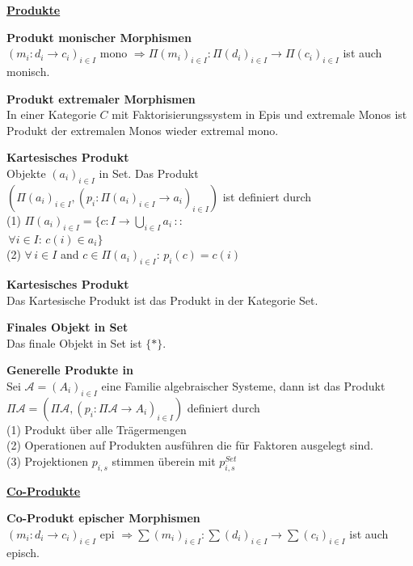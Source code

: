 \begin{multicols}{2}

\textbf{\underline{Produkte}} 

\textbf{ Produkt monischer Morphismen} \\
$(m_i: d_i \rightarrow c_i)_{i \in I}$ mono $\Rightarrow \Pi(m_i)_{i\in I}: \Pi(d_i)_{i \in I} \rightarrow \Pi(c_i)_{i \in I}$ ist auch monisch.

\textbf{ Produkt extremaler Morphismen} \\
In einer Kategorie $C$ mit Faktorisierungssystem in Epis und extremale Monos ist Produkt der extremalen Monos wieder extremal mono.

\textbf{ Kartesisches Produkt} \\
Objekte $(a_i)_{i \in I}$ in Set. Das Produkt $\left(\Pi(a_{i})_{i\in I},\left(p_{i}:\Pi(a_{i})_{i\in I}\rightarrow a_{i}\right)_{i\in I}\right)$ ist definiert durch \\
(1) $\Pi(a_{i})_{i\in I}=\{c:I\rightarrow\bigcup_{i\in I}a_{i}\,::$\\$ \,\forall i\in I:\, c(i)\in a_{i}\}$ \\
(2) $\forall \, i\in I$ and $c\in\Pi(a_{i})_{i\in I}$: $p_{i}(c)=c(i)$

\textbf{ Kartesisches Produkt} \\
Das Kartesische Produkt ist das Produkt in der Kategorie Set.


\textbf{ Finales Objekt in Set} \\
Das finale Objekt in Set ist $\{*\}$.

\textbf{ Generelle Produkte in \syssig} \\
Sei $\mathcal{A}=\left(A_{i}\right)_{i\in I}$ eine Familie algebraischer
Systeme, dann ist das Produkt $\Pi\mathcal{A}=\left(\Pi\mathcal{A},\left(p_{i}:\Pi\mathcal{A}\rightarrow A_{i}\right)_{i\in I}\right)$
definiert durch \\
(1) Produkt über alle Trägermengen \\
(2) Operationen auf Produkten ausführen die für Faktoren ausgelegt sind.\\
(3) \syssig Projektionen $p_{i,s}$ stimmen überein mit $p^{Set}_{i,s}$ 


\columnbreak

\textbf{\underline{Co-Produkte}} 

\textbf{ Co-Produkt epischer Morphismen} \\
$(m_i: d_i \rightarrow c_i)_{i \in I}$ epi $\Rightarrow \sum(m_i)_{i\in I}: \sum(d_i)_{i \in I} \rightarrow \sum(c_i)_{i \in I}$ ist auch episch.


\end{multicols}

